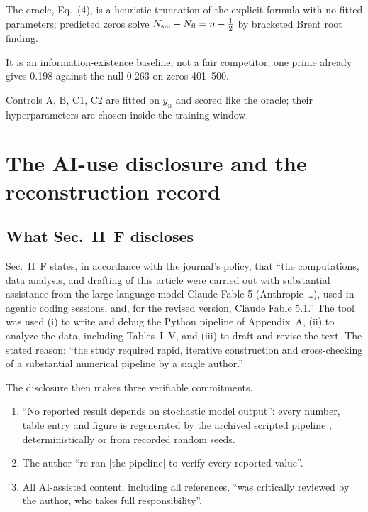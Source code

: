 \begin{keyideas}
\item The oracle, Eq.~(4), is a heuristic truncation of the explicit formula with no fitted parameters; predicted zeros solve $N_{\mathrm{sm}}+N_{\mathrm{fl}}=n-\tfrac12$ by bracketed Brent root finding.
\item It is an information-existence baseline, not a fair competitor; one prime already gives 0.198 against the null 0.263 on zeros 401--500.
\item Controls A, B, C1, C2 are fitted on $y_n$ and scored like the oracle; their hyperparameters are chosen inside the training window.
\end{keyideas}

\section{The AI-use disclosure and the reconstruction record}\label{sec:paper-setup-ai}

\subsection{What Sec.~II~F discloses}

Sec.~II~F states, in accordance with the journal's policy, that ``the computations, data analysis, and drafting of this article were carried out with substantial assistance from the large language model Claude Fable 5 (Anthropic \dots), used in agentic coding sessions, and, for the revised version, Claude Fable 5.1.'' The tool was used (i) to write and debug the Python pipeline of Appendix~A, (ii) to analyze the data, including Tables~I--V, and (iii) to draft and revise the text. The stated reason: ``the study required rapid, iterative construction and cross-checking of a substantial numerical pipeline by a single author.''

The disclosure then makes three verifiable commitments.
\begin{enumerate}
\item ``No reported result depends on stochastic model output'': every number, table entry and figure is regenerated by the archived scripted pipeline \cite{zenodo}, deterministically or from recorded random seeds.
\item The author ``re-ran [the pipeline] to verify every reported value''.
\item All AI-assisted content, including all references, ``was critically reviewed by the author, who takes full responsibility''.
\end{enumerate}

